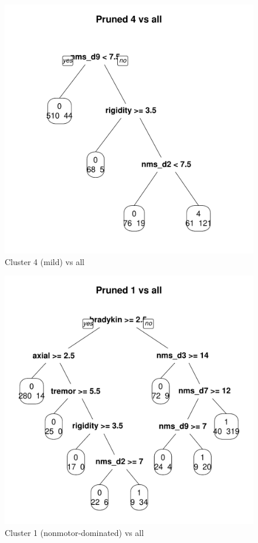 \documentclass[letterpaper,12pt]{article}
\begin{document}
\begin{figure}[h]
  \centering
  \includegraphics[width=\linewidth]{dtree-4va-pruned.pdf}
  \caption{Cluster 4 (mild) vs all}
  \label{fig:4va}
\end{figure}

\begin{figure}[h]
  \centering
  \includegraphics[width=\linewidth]{dtree-1va-pruned.pdf}
  \caption{Cluster 1 (nonmotor-dominated) vs all}
  \label{fig:1va}
\end{figure}
\end{document}
